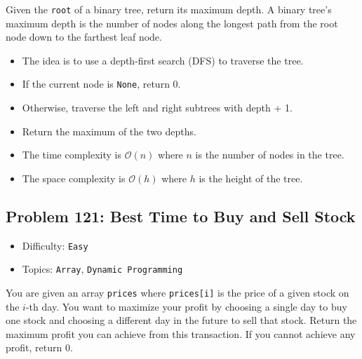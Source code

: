\begin{tcolorbox}[colback=gray!5!white, colframe=gray!80!black, boxrule=0.5pt, arc=2pt, left=6pt, right=6pt, top=6pt, bottom=6pt]
    Given the \texttt{root} of a binary tree, return its maximum depth.
    A binary tree's maximum depth is the number of nodes along the longest path from the root node down
    to the farthest leaf node.
\end{tcolorbox}

\begin{itemize}
    \item The idea is to use a depth-first search (DFS) to traverse the tree.
    \item If the current node is \texttt{None}, return 0.
    \item Otherwise, traverse the left and right subtrees with depth + 1.
    \item Return the maximum of the two depths.
    \item The time complexity is \(\mathcal{O}(n)\) where \(n\) is the number of nodes in the tree.
    \item The space complexity is \(\mathcal{O}(h)\) where \(h\) is the height of the tree.
\end{itemize}

\subsection*{Problem 121: Best Time to Buy and Sell Stock}
\begin{itemize}
    \setlength\itemsep{0.1em}  %
    \setlength\parskip{0pt}    %
    \item Difficulty: \texttt{Easy}
    \item Topics: \texttt{Array}, \texttt{Dynamic Programming}
\end{itemize}

\begin{tcolorbox}[colback=gray!5!white, colframe=gray!80!black, boxrule=0.5pt, arc=2pt, left=6pt, right=6pt, top=6pt, bottom=6pt]
    You are given an array \texttt{prices} where \texttt{prices[i]} is the price of a given stock on the
    \(i\)-th day. You want to maximize your profit by choosing a single day to buy one stock and
    choosing a different day in the future to sell that stock.
    Return the maximum profit you can achieve from this transaction. If you cannot achieve any profit,
    return 0.
\end{tcolorbox}

